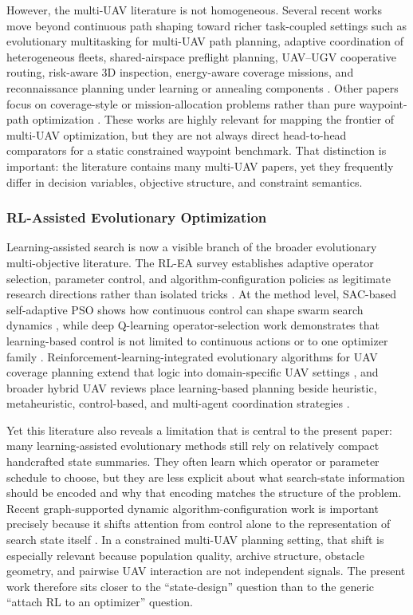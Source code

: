 \documentclass[a4paper,fleqn]{cas-dc}
\begin{document}
However, the multi-UAV literature is not homogeneous. Several recent works move beyond continuous path shaping toward richer task-coupled settings such as evolutionary multitasking for multi-UAV path planning, adaptive coordination of heterogeneous fleets, shared-airspace preflight planning, UAV--UGV cooperative routing, risk-aware 3D inspection, energy-aware coverage missions, and reconnaissance planning under learning or annealing components \cite{ref19,ref24,ref25,ref26,ref27,ref28}. Other papers focus on coverage-style or mission-allocation problems rather than pure waypoint-path optimization \cite{ref29,ref30}. These works are highly relevant for mapping the frontier of multi-UAV optimization, but they are not always direct head-to-head comparators for a static constrained waypoint benchmark. That distinction is important: the literature contains many multi-UAV papers, yet they frequently differ in decision variables, objective structure, and constraint semantics.

\subsubsection{RL-Assisted Evolutionary Optimization}

Learning-assisted search is now a visible branch of the broader evolutionary multi-objective literature. The RL-EA survey establishes adaptive operator selection, parameter control, and algorithm-configuration policies as legitimate research directions rather than isolated tricks \cite{ref3}. At the method level, SAC-based self-adaptive PSO shows how continuous control can shape swarm search dynamics \cite{ref4}, while deep Q-learning operator-selection work demonstrates that learning-based control is not limited to continuous actions or to one optimizer family \cite{ref5}. Reinforcement-learning-integrated evolutionary algorithms for UAV coverage planning extend that logic into domain-specific UAV settings \cite{ref29}, and broader hybrid UAV reviews place learning-based planning beside heuristic, metaheuristic, control-based, and multi-agent coordination strategies \cite{ref9}.

Yet this literature also reveals a limitation that is central to the present paper: many learning-assisted evolutionary methods still rely on relatively compact handcrafted state summaries. They often learn which operator or parameter schedule to choose, but they are less explicit about what search-state information should be encoded and why that encoding matches the structure of the problem. Recent graph-supported dynamic algorithm-configuration work is important precisely because it shifts attention from control alone to the representation of search state itself \cite{ref6}. In a constrained multi-UAV planning setting, that shift is especially relevant because population quality, archive structure, obstacle geometry, and pairwise UAV interaction are not independent signals. The present work therefore sits closer to the ``state-design'' question than to the generic ``attach RL to an optimizer'' question.
\end{document}
